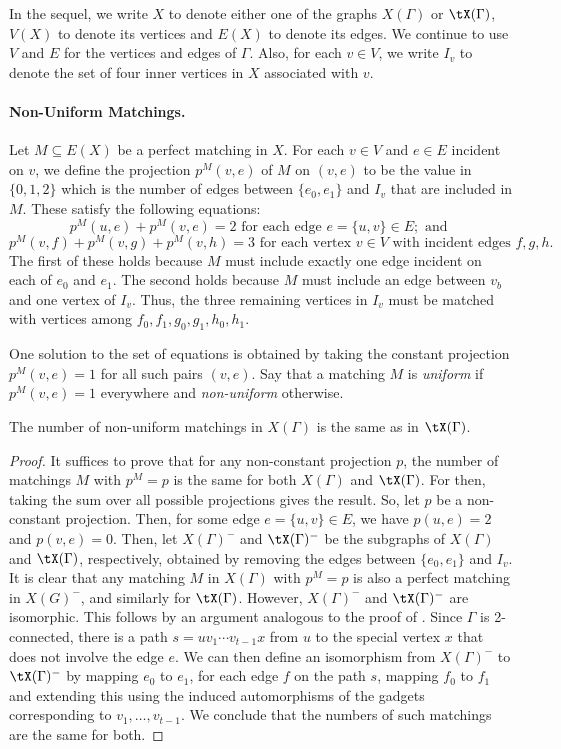 \documentclass{toc}
\begin{document}
In the sequel, we write $X$ to denote either one of the graphs $X(\Gamma)$ or
$\tX(\Gamma)$, $V(X)$ to denote its vertices and $E(X)$ to denote its edges. We
continue to use $V$ and $E$ for the vertices and edges of $\Gamma$. Also, for each $v
\in V$, we write $I_v$ to denote the set of four inner vertices in $X$
associated with $v$.

\paragraph{Non-Uniform Matchings.}
Let $M \subseteq E(X)$ be a perfect matching in $X$. For each $v \in V$ and $e
\in E$ incident on $v$, we define the projection $p^M(v,e)$ of $M$ on $(v,e)$ to
be the value in $\{0,1,2\}$ which is the number of edges between $\{e_0,e_1\}$
and $I_v$ that are included in $M$. These satisfy the following equations:
$$p^M(u,e) + p^M(v,e) = 2 \text{ for each edge } e = \{u,v\} \in E; \text{ and }$$
$$p^M(v,f) + p^M(v,g) + p^M(v,h) = 3 \text{ for each vertex } v \in V \text{ with incident edges } f,g,h.$$
The first of these holds because $M$ must include exactly one edge incident on
each of $e_0$ and $e_1$. The second holds because $M$ must include an edge
between $v_b$ and one vertex of $I_v$. Thus, the three remaining vertices in
$I_v$ must be matched with vertices among $f_0,f_1,g_0,g_1,h_0,h_1$.

One solution to the set of equations is obtained by taking the constant
projection $p^M(v,e) = 1$ for all such pairs $(v,e)$. Say that a matching $M$ is
\emph{uniform} if $p^M(v,e) = 1$ everywhere and \emph{non-uniform} otherwise.

\begin{lemma}\label{lem:non-uniform}
  The number of non-uniform matchings in $X(\Gamma)$ is the same as in $\tX(\Gamma)$.
\end{lemma}
\begin{proof}
  It suffices to prove that for any non-constant projection $p$, the number of
  matchings $M$ with $p^{M} = p$ is the same for both $X(\Gamma)$ and $\tX(\Gamma)$. For
  then, taking the sum over all possible projections gives the result. So, let
  $p$ be a non-constant projection. Then, for some edge $e = \{u,v\} \in E$, we
  have $p(u,e) = 2$ and $p(v,e) = 0$. Then, let $X(\Gamma)^-$ and $\tX(\Gamma)^-$ be the
  subgraphs of $X(\Gamma)$ and $\tX(\Gamma)$, 
  respectively, %
  obtained by removing the edges
  between $\{e_0,e_1\}$ and $I_v$. It is clear that any matching $M$ in $X(\Gamma)$
  with $p^{M} = p$ is also a perfect matching in $X(G)^-$, and similarly for
  $\tX(\Gamma)$. However, $X(\Gamma)^-$ and $\tX(\Gamma)^-$ are isomorphic. This follows by an
  argument analogous to the proof of . Since $\Gamma$ is
  2-connected, there is a path $s = uv_1\cdots v_{t-1}x$ from $u$ to the special vertex $x$ that does
  not involve the edge $e$. We can then define an isomorphism from $X(\Gamma)^-$ to
  $\tX(\Gamma)^-$ by mapping $e_0$ to $e_1$, for each edge $f$ on the path $s$, mapping
  $f_0$ to $f_1$ and extending this using the induced automorphisms of the
  gadgets corresponding to $v_1,\ldots,v_{t-1}$. We conclude that the numbers of
  such matchings are the same for both.
\end{proof}
\end{document}
